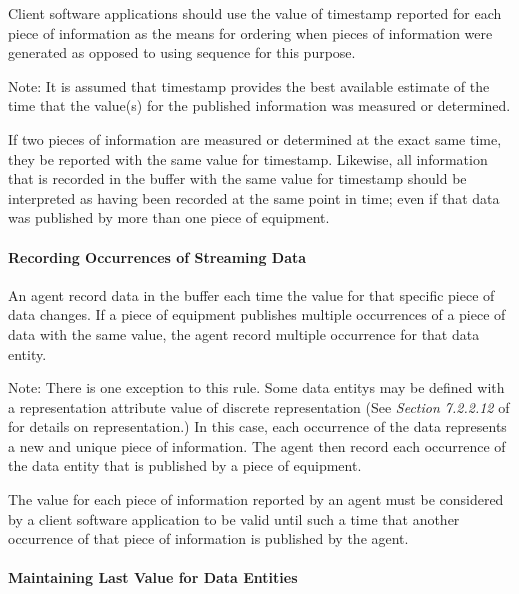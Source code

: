 \documentclass{mtconnect}	%
\begin{document}
Client software applications should use the value of \gls{timestamp} reported for each piece of information as the means for ordering when pieces of information were generated as opposed to using \gls{sequence} for this purpose.

\begin{note}
Note: It is assumed that \gls{timestamp} provides the best available estimate of the time that the value(s) for the published information was measured or determined.

\end{note}

If two pieces of information are measured or determined at the exact same time, they \MUST be reported with the same value for \gls{timestamp}.  Likewise, all information that is recorded in the \gls{buffer} with the same value for \gls{timestamp} should be interpreted as having been recorded at the same point in time; even if that data was published by more than one piece of equipment. 

\paragraph{Recording Occurrences of Streaming Data}\mbox{}

An \gls{agent} \MUST record data in the \gls{buffer} each time the value for that specific piece of data changes.  If a piece of equipment publishes multiple occurrences of a piece of data with the same value, the \gls{agent} \MUSTNOT record multiple occurrence for that \gls{data entity}.

\begin{note}
Note:	There is one exception to this rule.  Some \glspl{data entity} may be defined with a \gls{representation} attribute value of \gls{discrete representation} (See \textit{Section 7.2.2.12} of  for details on \gls{representation}.)  In this case, each occurrence of the data represents a new and unique piece of information.  The \gls{agent} \MUST then record each occurrence of the \gls{data entity} that is published by a piece of equipment.

\end{note}

The value for each piece of information reported by an \gls{agent} must be considered by a client software application to be valid until such a time that another occurrence of that piece of information is published by the \gls{agent}.

\paragraph{Maintaining Last Value for Data Entities}\mbox{}
\end{document}

